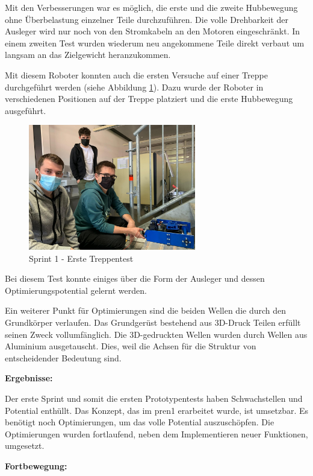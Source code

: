 Mit den Verbesserungen war es möglich, die erste und die zweite Hubbewegung ohne Überbelastung einzelner Teile durchzuführen.
Die volle Drehbarkeit der Ausleger wird nur noch von den Stromkabeln an den Motoren eingeschränkt. In einem zweiten Test wurden wiederum neu angekommene Teile direkt verbaut um langsam an das Zielgewicht heranzukommen.

Mit diesem Roboter konnten auch die ersten Versuche auf einer Treppe durchgeführt werden (siehe Abbildung \ref{fig:ersteTreppentests}). Dazu wurde der Roboter in verschiedenen Positionen auf der Treppe platziert und die erste Hubbewegung ausgeführt.

\begin{figure}[H]
  \includegraphics[width=0.65\textwidth]{img/Sprint1/pren1_sprint1_3.png}
  \centering
  \caption{Sprint 1 - Erste Treppentest}
  \label{fig:ersteTreppentests}
\end{figure}

Bei diesem Test konnte einiges über die Form der Ausleger und dessen Optimierungspotential gelernt werden.

Ein weiterer Punkt für Optimierungen sind die beiden Wellen die durch den Grundkörper verlaufen. Das Grundgerüst bestehend aus 3D-Druck Teilen erfüllt seinen Zweck vollumfänglich. Die 3D-gedruckten Wellen wurden durch Wellen aus Aluminium ausgetauscht. Dies, weil die Achsen für die Struktur von entscheidender Bedeutung sind. 

\textbf{Ergebnisse:}

Der erste Sprint und somit die ersten Prototypentests haben Schwachstellen und Potential enthüllt. Das Konzept, das im \acrshort{pren1} erarbeitet wurde, ist umsetzbar. Es benötigt noch Optimierungen, um das volle Potential auszuschöpfen. Die Optimierungen wurden fortlaufend, neben dem Implementieren neuer Funktionen, umgesetzt.

\textbf{Fortbewegung:}

